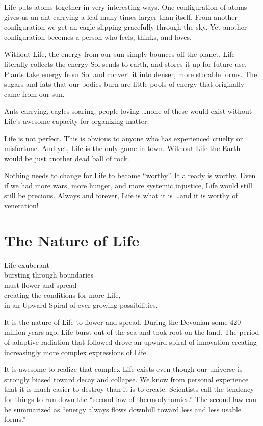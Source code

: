 \documentclass[ebook,12pt,openany,twoside]{memoir}
\newcommand{\tab}{\hspace*{2em}}
\newcommand{\imagefacingchapter}[1]{
  \cleartoverso
  \clearpage \null
  \thispagestyle{cleared}
  \AddToShipoutPictureBG*{%
    \AtStockLowerLeft{%
      \texttt{[image: \#1]}
    }
  }
  \clearpage
}
\begin{document}
\noindent Life puts atoms together in very interesting ways. One configuration
of atoms gives us an ant carrying a leaf many times larger than itself. From
another configuration we get an eagle slipping gracefully through the sky. Yet
another configuration becomes a person who feels, thinks, and loves.

Without Life, the energy from our sun simply bounces off the planet. Life
literally collects the energy Sol sends to earth, and stores it up for future
use. Plants take energy from Sol and convert it into denser, more storable
forms. The sugars and fats that our bodies burn are little pools of energy that
originally came from our sun.

Ants carrying, eagles soaring, people loving \ldots none of these would exist
without Life's awesome capacity for organizing matter.

Life is not perfect. This is obvious to anyone who has experienced cruelty or
misfortune. And yet, Life is the only game in town. Without Life the Earth
would be just another dead ball of rock.

Nothing needs to change for Life to become ``worthy''. It already is worthy.
Even if we had more wars, more hunger, and more systemic injustice, Life would
still still be precious. Always and forever, Life is what it is \ldots and it
is worthy of veneration!

\imagefacingchapter{images/UpwardSpiral}
\chapter{The Nature of Life}

\setlength\epigraphwidth{3.6in}
\epigraph{
  Life exuberant\\
  bursting through boundaries\\
  must flower and spread\\
  \tab creating the conditions for more Life,\\
  \tab in an Upward Spiral of ever-growing possibilities.
}{}

\noindent It is the nature of Life to flower and spread. During the Devonian
some 420 million years ago, Life burst out of the sea and took root on the
land. The period of adaptive radiation that followed drove an upward spiral of
innovation creating increasingly more complex expressions of Life.

It is awesome to realize that complex Life exists even though our universe is
strongly biased toward decay and collapse. We know from personal experience
that it is much easier to destroy than it is to create. Scientists call the
tendency for things to run down the ``second law of thermodynamics.'' The
second law can be summarized as ``energy always flows downhill toward less and
less usable forms.''
\end{document}
